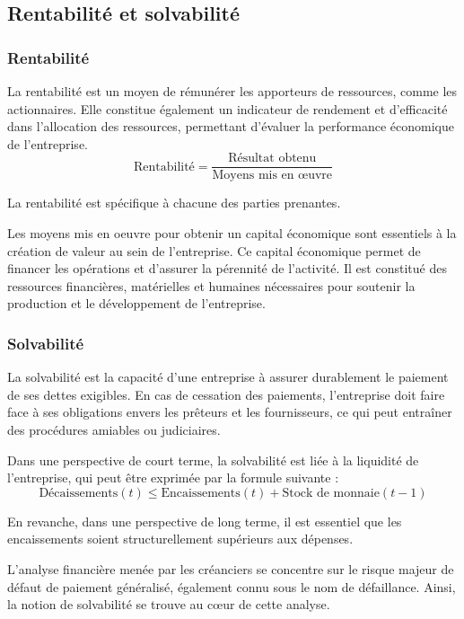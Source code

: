 \documentclass[a4paper, 12pt]{report}
\begin{document}
\subsection{Rentabilité et solvabilité}

\subsubsection{Rentabilité}

La rentabilité est un moyen de rémunérer les apporteurs de ressources, comme les actionnaires. Elle constitue également un indicateur de rendement et d'efficacité dans l'allocation des ressources, permettant d'évaluer la performance économique de l'entreprise.
\[ \text{Rentabilité} = \frac{\text{Résultat obtenu}}{\text{Moyens mis en œuvre}} \]

La rentabilité est spécifique à chacune des parties prenantes.

Les moyens mis en oeuvre pour obtenir un capital économique sont essentiels à la création de valeur au sein de l'entreprise. Ce capital économique permet de financer les opérations et d'assurer la pérennité de l'activité. Il est constitué des ressources financières, matérielles et humaines nécessaires pour soutenir la production et le développement de l'entreprise.

\subsubsection{Solvabilité}

La solvabilité est la capacité d'une entreprise à assurer durablement le paiement de ses dettes exigibles. En cas de cessation des paiements, l'entreprise doit faire face à ses obligations envers les prêteurs et les fournisseurs, ce qui peut entraîner des procédures amiables ou judiciaires.

Dans une perspective de court terme, la solvabilité est liée à la liquidité de l'entreprise, qui peut être exprimée par la formule suivante :
\[
\text{Décaissements}(t) \leq \text{Encaissements}(t) + \text{Stock de monnaie}(t-1)
\]

En revanche, dans une perspective de long terme, il est essentiel que les encaissements soient structurellement supérieurs aux dépenses.

L'analyse financière menée par les créanciers se concentre sur le risque majeur de défaut de paiement généralisé, également connu sous le nom de défaillance. Ainsi, la notion de solvabilité se trouve au cœur de cette analyse.
\end{document}
